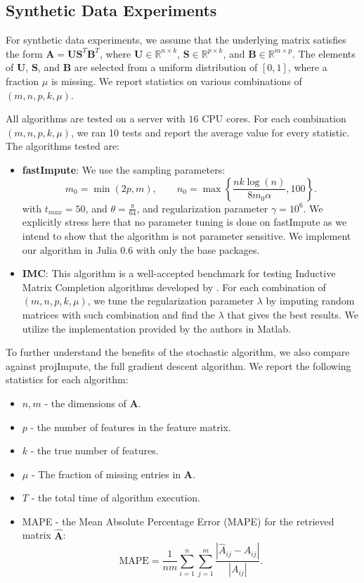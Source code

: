 \documentclass[twoside,11pt]{article}
\newcommand{\md}[1]{\mathbb{#1}}
\begin{document}
\subsection{Synthetic Data Experiments}
 For synthetic data experiments, we assume that the underlying matrix satisfies the form $\bm{A}=\bm{U}\bm{S}^T\bm{B}^T$, where $\bm{U} \in \md{R}^{n \times k}$, $\bm{S} \in \md{R}^{p\times k}$, and $\bm{B} \in \md{R}^{m\times p}$. The elements of $\bm{U}$, $\bm{S}$, and $\bm{B}$ are selected from a uniform distribution of $[0,1]$, where a fraction  $\mu$ is missing. We report statistics on various combinations of $(m,n,p,k,\mu)$.

All algorithms are tested on a server with $16$ CPU cores. For each combination $(m,n,p,k,\mu)$, we ran 10 tests and report  the average value for every statistic.
The algorithms tested are:
 \begin{itemize}
     \item \textbf{fastImpute}: We use the sampling parameters:
     $$m_0=\min(2p,m), \qquad n_0=\max\left\{\frac{nk\log (n)}{8m_0\alpha},100\right\}.$$
     with $t_{max}=50$, and $\theta=\frac{\pi}{64}$, and regularization parameter $\gamma=10^6$. We explicitly stress here that no parameter tuning is done on fastImpute as we intend to show that the algorithm is not parameter sensitive.   We implement our algorithm in Julia 0.6 with only the base packages.
     \item \textbf{IMC}: This algorithm is a well-accepted benchmark for testing Inductive Matrix Completion algorithms developed by \cite{natarajan2014inductive}. For each combination of $(m,n,p,k,\mu)$, we tune the regularization parameter $\lambda$ by imputing random matrices with such combination and find the $\lambda$ that gives the best results. We utilize the implementation provided by the authors in Matlab.
 \end{itemize}
To further understand the benefits of the stochastic algorithm, we also compare against projImpute, the full gradient descent algorithm. We report the following statistics for each algorithm:
\begin{itemize}
	\item $n,m$ - the dimensions of $\bm{A}$.
	\item $p$ - the number of features in the feature matrix.
	\item $k$ - the true number of features.
	\item $\mu$ - The fraction of missing entries in $\bm{A}$.
	\item $T$ - the total time of algorithm execution.
	\item MAPE - the Mean Absolute Percentage Error (MAPE) for the retrieved matrix $\hat{\bm{A}}$:
	\[\text{MAPE}=\frac{1}{nm} \sum_{i=1}^n \sum_{j=1}^m \frac{|\hat{A}_{ij}-A_{ij}|}{|A_{ij}|}.\]
\end{itemize}
\end{document}
